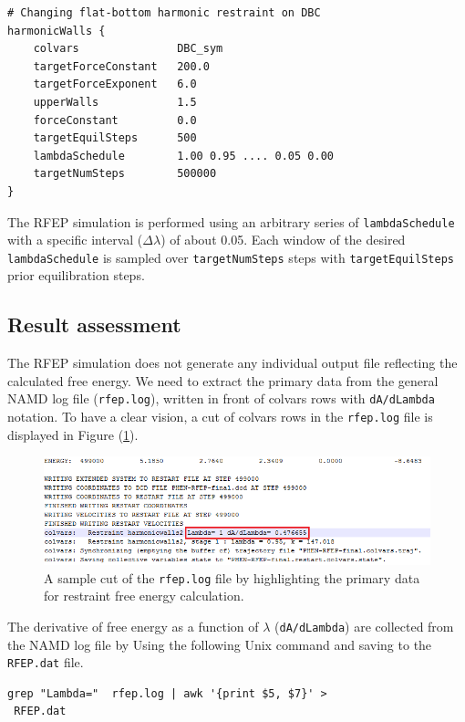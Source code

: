 \documentclass[9pt,tutorial]{livecoms}
\begin{document}
\begin{verbatim}
# Changing flat-bottom harmonic restraint on DBC 
harmonicWalls {
    colvars               DBC_sym
    targetForceConstant   200.0
    targetForceExponent   6.0
    upperWalls            1.5  
    forceConstant         0.0
    targetEquilSteps      500
    lambdaSchedule        1.00 0.95 .... 0.05 0.00
    targetNumSteps        500000
}
\end{verbatim}

The RFEP simulation is performed using an arbitrary series of \texttt{lambdaSchedule} with a specific interval ({$\Delta\lambda$}) of about 0.05. Each window of the desired \texttt{lambdaSchedule} is sampled over \texttt{targetNumSteps} steps with \texttt{targetEquilSteps} prior equilibration steps.


\subsection{Result assessment}
The RFEP simulation does not generate any individual output file reflecting the calculated free energy. We need to extract the primary data from the general NAMD log file (\texttt{rfep.log}), written in front of colvars rows with \texttt{dA/dLambda} notation. To have a clear vision, a cut of colvars rows in the \texttt{rfep.log} file is displayed in Figure (\ref{fig:RFEP1}). 

\begin{figure}[h!t]
\centering
\includegraphics[width=\linewidth]{RFEP-log}
\caption{A sample cut of the \texttt{rfep.log} file by highlighting the primary data for restraint free energy calculation. }
\label{fig:RFEP1}
\end{figure}

The derivative of free energy as a function of {$\lambda$} (\texttt{dA/dLambda}) are collected from the NAMD log file by Using the following Unix command and saving to the \texttt{RFEP.dat} file.
\begin{verbatim}
grep "Lambda="  rfep.log | awk '{print $5, $7}' >
 RFEP.dat
\end{verbatim}
\end{document}
